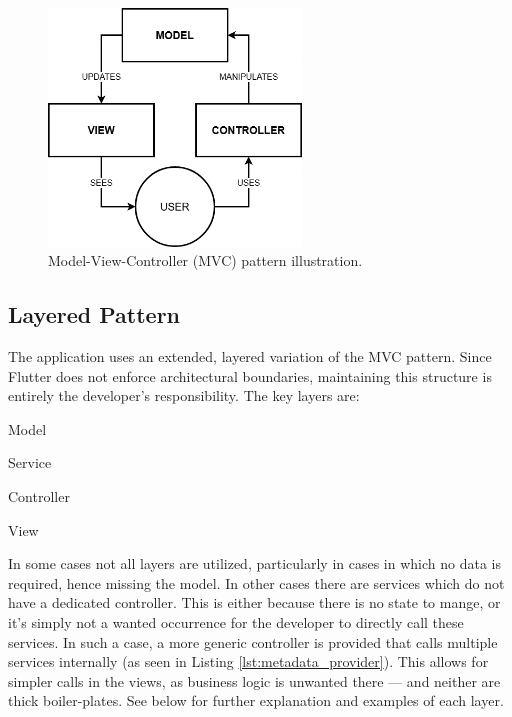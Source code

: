 \documentclass[
  digital,     %
  oneside,     %
  nosansbold,  %
  nocolorbold, %
  lof,         %
  lot,         %
]{fithesis4}
\begin{document}
\begin{figure}[!hb]
    \centering
    \includegraphics[width=0.6\textwidth]{assets/diagrams/mvc.drawio.png}
    \caption[Model-View-Controller pattern]{Model-View-Controller (\gls{MVC}) pattern illustration.}
    \label{fig:mvc-pattern}
\end{figure}

\subsection{Layered Pattern}
The application uses an extended, layered variation of the \gls{MVC} pattern. Since Flutter does not enforce architectural boundaries, maintaining this structure is entirely the developer's responsibility. The key layers are:

\begin{compactitem}
    \item Model
    \item Service
    \item Controller
    \item View
\end{compactitem}

In some cases not all layers are utilized, particularly in cases in which no data is required, hence missing the model. In other cases there are services which do not have a dedicated controller. This is either because there is no state to mange, or it's simply not a wanted occurrence for the developer to directly call these services. In such a case, a more generic controller is provided that calls multiple services internally (as seen in Listing \ref{lst:metadata_provider}). This allows for simpler calls in the views, as business logic is unwanted there --- and neither are thick boiler-plates. See below for further explanation and examples of each layer.
\end{document}
